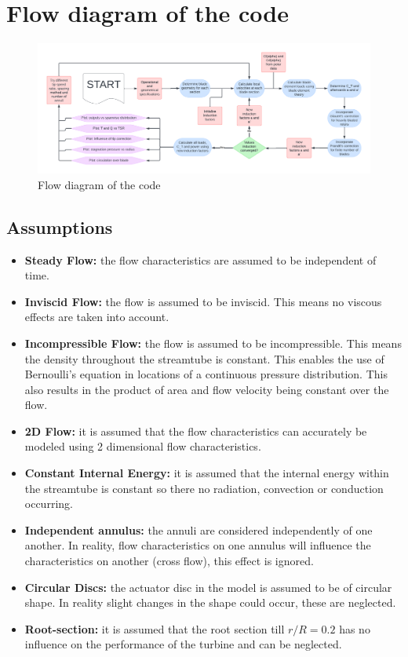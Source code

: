 \chapter{Flow diagram of the code}

\begin{figure}[H]
    \centering
    \includegraphics[width=\textwidth]{Figures/Blank diagram.pdf}
    \caption{Flow diagram of the code}
    \label{fig:enter-label}
\end{figure}

\section{Assumptions}
\begin{itemize}
    \item \textbf{Steady Flow:} the flow characteristics are assumed to be independent of time.
    \item \textbf{Inviscid Flow:} the flow is assumed to be inviscid. This means no viscous effects are taken into account.
    \item \textbf{Incompressible Flow:} the flow is assumed to be incompressible. This means the density throughout the streamtube is constant. This enables the use of Bernoulli's equation in locations of a continuous pressure distribution. This also results in the product of area and flow velocity being constant over the flow.
    \item \textbf{2D Flow:} it is assumed that the flow characteristics can accurately be modeled using 2 dimensional flow characteristics.
    \item \textbf{Constant Internal Energy:}  it is assumed that the internal energy within the streamtube is constant so there no radiation, convection or conduction occurring.
    \item \textbf{Independent annulus:} the annuli are considered independently of one another. In reality, flow characteristics on one annulus will influence the characteristics on another (cross flow), this effect is ignored.
    \item \textbf{Circular Discs:} the actuator disc in the model is assumed to be of circular shape. In reality slight changes in the shape could occur, these are neglected.
    \item \textbf{Root-section:} it is assumed that the root section till $r/R = 0.2$ has no influence on the performance of the turbine and can be neglected.
\end{itemize}